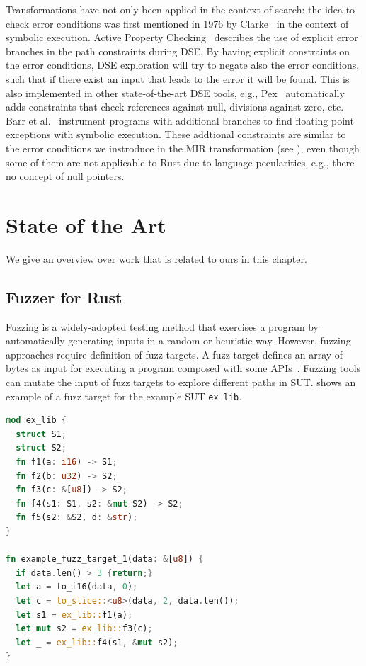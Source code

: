 \documentclass[paper=a4,%
  twoside,%
  BCOR4mm,%
  abstract=true,%
  toc=bibliography,%
  chapterprefix=true,%
  toc=bibliographynumbered,%
  open=right,%
  english,%
  pagesize=pdftex]{scrreprt}
\begin{document}

Transformations have not only been applied in the context of search: the idea to check error conditions was first mentioned in 1976 by Clarke~\cite{Clarke1976} in the context of symbolic execution. Active Property Checking~\cite{Godefroid_2005} describes the use of explicit error branches in the path constraints during \ac{DSE}. By having explicit constraints on the error conditions, \ac{DSE} exploration will try to negate also the error conditions, such that if there exist an input that leads to the error it will be found. This is also implemented in other state-of-the-art \ac{DSE} tools, e.g., Pex~\cite{Tillmann2008} automatically adds constraints that check references against null, divisions against zero, etc. Barr et al.~\cite{Barr2013} instrument programs with additional branches to find floating point exceptions with symbolic execution. These addtional constraints are similar to the error conditions we instroduce in the \ac{MIR} transformation (see ), even though some of them are not applicable to Rust due to language pecularities, e.g., there no concept of null pointers.

\clearpage
\chapter{State of the Art}
\label{chap:state-of-the-art}
We give an overview over work that is related to ours in this chapter. 

\section{Fuzzer for Rust}
Fuzzing is a widely-adopted testing method that exercises a program by automatically generating inputs in a random or heuristic way. However, fuzzing approaches require definition of fuzz targets. A fuzz target defines an array of bytes as input for executing a program composed with some \acp{API}~\cite{Jiang2021}. Fuzzing tools can mutate the input of fuzz targets to explore different paths in \ac{SUT}.  shows an example of a fuzz target for the example \ac{SUT} \lstinline{ex_lib}.

\begin{lstlisting}[language=Rust, style=boxed, caption={A sample problem for fuzz target generation~\cite{Jiang2021}}, label=lst:fuzz-target-example]
mod ex_lib {
  struct S1;
  struct S2;
  fn f1(a: i16) -> S1;
  fn f2(b: u32) -> S2;
  fn f3(c: &[u8]) -> S2;
  fn f4(s1: S1, s2: &mut S2) -> S2;
  fn f5(s2: &S2, d: &str);
}

fn example_fuzz_target_1(data: &[u8]) {
  if data.len() > 3 {return;}
  let a = to_i16(data, 0);
  let c = to_slice::<u8>(data, 2, data.len());
  let s1 = ex_lib::f1(a);
  let mut s2 = ex_lib::f3(c);
  let _ = ex_lib::f4(s1, &mut s2);
}
\end{lstlisting}
\end{document}
